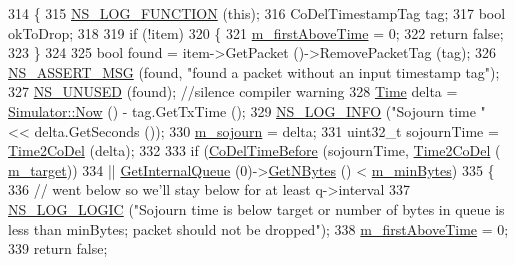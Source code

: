 \begin{DoxyCode}
314 \{
315   \hyperlink{log-macros-disabled_8h_a90b90d5bad1f39cb1b64923ea94c0761}{NS\_LOG\_FUNCTION} (\textcolor{keyword}{this});
316   CoDelTimestampTag tag;
317   \textcolor{keywordtype}{bool} okToDrop;
318 
319   \textcolor{keywordflow}{if} (!item)
320     \{
321       \hyperlink{classns3_1_1CoDelQueueDisc_acd66659e7066b6d1d322fee745e43adc}{m\_firstAboveTime} = 0;
322       \textcolor{keywordflow}{return} \textcolor{keyword}{false};
323     \}
324 
325   \textcolor{keywordtype}{bool} found = item->GetPacket ()->RemovePacketTag (tag);
326   \hyperlink{assert_8h_aff5ece9066c74e681e74999856f08539}{NS\_ASSERT\_MSG} (found, \textcolor{stringliteral}{"found a packet without an input timestamp tag"});
327   \hyperlink{unused_8h_a3ba03ad859378e9f01285afb60f0e3ab}{NS\_UNUSED} (found);    \textcolor{comment}{//silence compiler warning}
328   \hyperlink{namespacens3_1_1TracedValueCallback_a7ffd3e7c142ffe7c8a1d2db9b8de38ec}{Time} delta = \hyperlink{classns3_1_1Simulator_ac3178fa975b419f7875e7105be122800}{Simulator::Now} () - tag.GetTxTime ();
329   \hyperlink{group__logging_gafbd73ee2cf9f26b319f49086d8e860fb}{NS\_LOG\_INFO} (\textcolor{stringliteral}{"Sojourn time "} << delta.GetSeconds ());
330   \hyperlink{classns3_1_1CoDelQueueDisc_a13049e1c243e1467bd1637cf203c60cb}{m\_sojourn} = delta;
331   uint32\_t sojournTime = \hyperlink{classns3_1_1CoDelQueueDisc_aba2aa3ab9d1adecc1b60023512656972}{Time2CoDel} (delta);
332 
333   \textcolor{keywordflow}{if} (\hyperlink{classns3_1_1CoDelQueueDisc_aeb986db9ac673c2eb4f5ead515edfe43}{CoDelTimeBefore} (sojournTime, \hyperlink{classns3_1_1CoDelQueueDisc_aba2aa3ab9d1adecc1b60023512656972}{Time2CoDel} (
      \hyperlink{classns3_1_1CoDelQueueDisc_aa9cb41f0fc76d917b4648ac9da7e9ae3}{m\_target}))
334       || \hyperlink{classns3_1_1QueueDisc_adf09b498c07c5677c26ea4b8309def74}{GetInternalQueue} (0)->\hyperlink{classns3_1_1QueueDisc_ac87d3bbf7381d64808f6764bdfd812e5}{GetNBytes} () < 
      \hyperlink{classns3_1_1CoDelQueueDisc_a508ecc494f78426c539caa21c7109bc2}{m\_minBytes})
335     \{
336       \textcolor{comment}{// went below so we'll stay below for at least q->interval}
337       \hyperlink{group__logging_ga88acd260151caf2db9c0fc84997f45ce}{NS\_LOG\_LOGIC} (\textcolor{stringliteral}{"Sojourn time is below target or number of bytes in queue is less than
       minBytes; packet should not be dropped"});
338       \hyperlink{classns3_1_1CoDelQueueDisc_acd66659e7066b6d1d322fee745e43adc}{m\_firstAboveTime} = 0;
339       \textcolor{keywordflow}{return} \textcolor{keyword}{false};

\end{DoxyCode}
